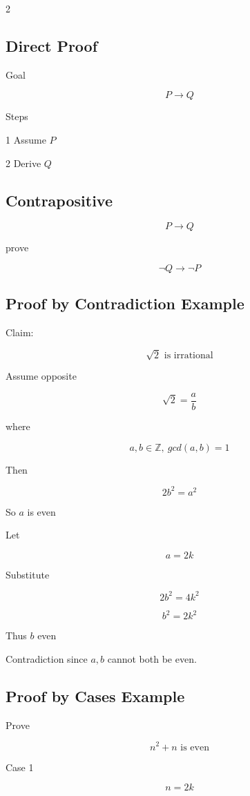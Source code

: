 \documentclass[9pt]{article}
\begin{document}
\begin{multicols}{2}
\subsection*{Direct Proof}

Goal

\[
P\rightarrow Q
\]

Steps

1 Assume $P$

2 Derive $Q$

\subsection*{Contrapositive}

\[
P\rightarrow Q
\]

prove

\[
\neg Q\rightarrow \neg P
\]

\subsection*{Proof by Contradiction Example}

Claim:

\[
\sqrt2 \text{ is irrational}
\]

Assume opposite

\[
\sqrt2=\frac ab
\]

where

\[
a,b\in \mathbb{Z},\ gcd(a,b)=1
\]

Then

\[
2b^2=a^2
\]

So $a$ is even

Let

\[
a=2k
\]

Substitute

\[
2b^2=4k^2
\]

\[
b^2=2k^2
\]

Thus $b$ even

Contradiction since $a,b$ cannot both be even.

\subsection*{Proof by Cases Example}

Prove

\[
n^2+n \text{ is even}
\]

Case 1

\[
n=2k
\]


\end{multicols}
\end{document}
